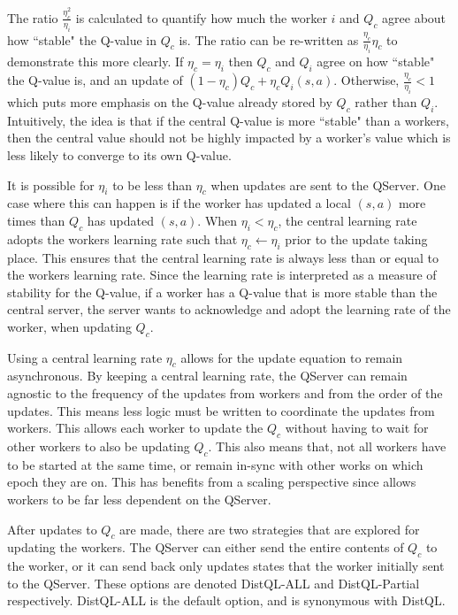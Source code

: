 \documentclass[jair,twoside,11pt,theapa]{article}
\begin{document}
The ratio $\frac{\eta_{c}^{2}}{\eta_{i}}$ is calculated to quantify how much the worker $i$ and $Q_c$ agree about how ``stable" the Q-value in $Q_c$ is. The ratio can be re-written as $\frac{\eta_{c}}{\eta_{i}} \eta_{c}$ to demonstrate this more clearly. If $\eta_{c} = \eta_{i}$ then $Q_c$ and $Q_i$ agree on how ``stable" the Q-value is, and an update of $(1-\eta_{c})Q_c + \eta_{c} Q_i(s,a)$. Otherwise, $\frac{\eta_c}{\eta_i} < 1$ which puts more emphasis on the Q-value already stored by $Q_c$ rather than $Q_i$. Intuitively, the idea is that if the central Q-value is more ``stable" than a workers, then the central value should not be highly impacted by a worker's value which is less likely to converge to its own Q-value.

It is possible for $\eta_i$ to be less than $\eta_c$ when updates are sent to the QServer. One case where this can happen is if the worker has updated a local $(s,a)$ more times than $Q_c$ has updated $(s,a)$. When $\eta_i < \eta_c$, the central learning rate adopts the workers learning rate such that $\eta_c \leftarrow \eta_i$ prior to the update taking place. This ensures that the central learning rate is always less than or equal to the workers learning rate. Since the learning rate is interpreted as a measure of stability for the Q-value, if a worker has a Q-value that is more stable than the central server, the server wants to acknowledge and adopt the learning rate of the worker, when updating $Q_c$.


Using a central learning rate $\eta_c$ allows for the update equation to remain asynchronous. By keeping a central learning rate, the QServer can remain agnostic to the frequency of the updates from workers and from the order of the updates. This means less logic must be written to coordinate the updates from workers. This allows each worker to update the $Q_c$ without having to wait for other workers to also be updating $Q_c$. This also means that, not all workers have to be started at the same time, or remain in-sync with other works on which epoch they are on. This has benefits from a scaling perspective since allows workers to be far less dependent on the QServer. 

After updates to $Q_c$ are made, there are two strategies that are explored for updating the workers. The QServer can either send the entire contents of $Q_c$ to the worker, or it can send back only updates states that the worker initially sent to the QServer. These options are denoted DistQL-ALL and DistQL-Partial respectively. DistQL-ALL is the default option, and is synonymous with DistQL. 
\end{document}
